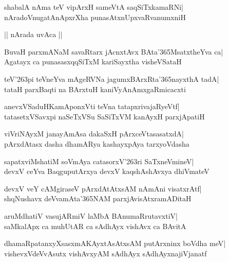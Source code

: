 \documentclass[twoside,12pt,openright]{book}
\def\S{\char'263}
\newcounter{shloka}[chapter]
\begin{document}
\begin{shloka}%
shabalA nAma teV vipArxH sameVtA saqSiTxkamaRNi|\\
nAradoVnugatAnApxrXha punasAtxnUpxvaRvanumxniH
\end{shloka}

\begin{center}
|| nArada uvAca ||
\end{center}
\begin{shloka}%
BuvaH parxmANaM savaRtarx jAcnxtAvx BAta\char'365MsatxtheYva ca|\\
Agatayx ca punasasxqqSiTxM kariSayxtha visheVSataH
\end{shloka}

\begin{shloka}%
teV\S pi teVneYva mAgeRVNa jagumxBArxRta\char'365nayxthA tadA|\\
tataH parxBaqti na BArxtuH kaniVyAnAmxgaRmicacxti
\end{shloka}

\begin{shloka}%
anevxVSaduHKamAponxVti teVna tatapxrivajaRyeVtf|\\
tatasetxVSavxpi naSeTxVSu SaSiTxVM kanAyxH parxjApatiH
\end{shloka}

\begin{shloka}%
viVriNAyxM janayAmAsa dakaSxH pArxceVtasasatxdA|\\
pArxdAtasx dasha dhamARya kashayxpAya tarxyoVdasha
\end{shloka}

\begin{shloka}%
sapatxviMshatiM soVmAya catasorxV\S ri SaTxneVmineV|\\
devxV ceYva BaqguputArxya devxV kaqshAshAvxya dhiVmateV
\end{shloka}

\begin{shloka}%
devxV veY cAMgiraseV pArxdAtAtxsAM nAmAni visatxrAtf|\\
shqNushavx deVvamAta\char'365NAM parxjAvisAtxramADitaH
\end{shloka}

\begin{shloka}%
aruMdhatiV vasujARmiV laMbA BAnumaRrutavxtiV|\\
saMkalApx ca muhUtAR ca sAdhAyx vishAvx ca BAvitA
\end{shloka}

\begin{shloka}%
dhamaRpatanxyXsasxmAKAyxtAsAtxsAM putArxninx boVdha meV|\\
vishevxVdeVvAsutx vishAvxyAM sAdhAyx sAdhAyxnajiVjanatf
\end{shloka}
\end{document}
